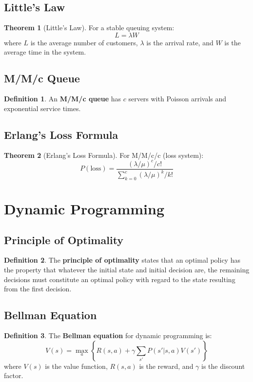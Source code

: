 \documentclass[11pt]{article}
\theoremstyle{definition}
\newtheorem{definition}{Definition}[section]
\newtheorem{theorem}{Theorem}[section]
\begin{document}
\subsection{Little's Law}
\begin{theorem}[Little's Law]
For a stable queuing system:
$$L = \lambda W$$
where $L$ is the average number of customers, $\lambda$ is the arrival rate, and $W$ is the average time in the system.
\end{theorem}

\subsection{M/M/c Queue}
\begin{definition}
An \textbf{M/M/c queue} has $c$ servers with Poisson arrivals and exponential service times.
\end{definition}

\subsection{Erlang's Loss Formula}
\begin{theorem}[Erlang's Loss Formula]
For M/M/c/c (loss system):
$$P(\text{loss}) = \frac{(\lambda/\mu)^c/c!}{\sum_{k=0}^c (\lambda/\mu)^k/k!}$$
\end{theorem}

\section{Dynamic Programming}

\subsection{Principle of Optimality}
\begin{definition}
The \textbf{principle of optimality} states that an optimal policy has the property that whatever the initial state and initial decision are, the remaining decisions must constitute an optimal policy with regard to the state resulting from the first decision.
\end{definition}

\subsection{Bellman Equation}
\begin{definition}
The \textbf{Bellman equation} for dynamic programming is:
$$V(s) = \max_a \left\{ R(s,a) + \gamma \sum_{s'} P(s'|s,a) V(s') \right\}$$
where $V(s)$ is the value function, $R(s,a)$ is the reward, and $\gamma$ is the discount factor.
\end{definition}
\end{document}
